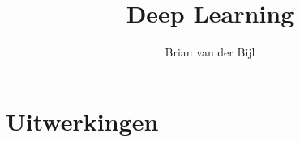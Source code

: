 \documentclass[a4paper,openany]{tufte-book-hu}
\title{Deep Learning}
\author{Brian van der Bijl}
\begin{document}
\maketitle

\mainmatter

\part{Uitwerkingen}

\end{document}
